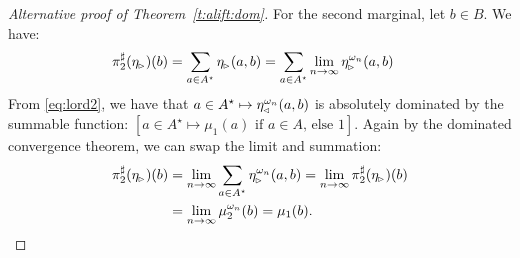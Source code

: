 \documentclass{lmcs}
\begin{document}
\begin{proof}[Alternative proof of Theorem~\ref{t:alift:dom}]
  \medskip

  For the second marginal, let $b \in B$. We have:
  \begin{align*}
    \pi_{2}^{\sharp}(\eta_{\mspace{-1.5mu}{\scriptscriptstyle \vartriangleright}})(b)
      &= \sum_{a \in A^\star} \eta_{\mspace{-1.5mu}{\scriptscriptstyle \vartriangleright}}(a, b)
       = \sum_{a \in A^\star} \lim_{n \to \infty} \eta_{\mspace{-1.5mu}{\scriptscriptstyle \vartriangleright}}^{\omega_n}(a, b)
  \end{align*}
  From \eqref{eq:lord2}, we have that
  $a \in A^\star \mapsto \eta_{\mspace{-1.5mu}{\scriptscriptstyle \vartriangleleft}}^{\omega_n}(a, b)$ is absolutely
  dominated by the summable function:
  $[a \in A^\star \mapsto \text{$\mu_1(a)$ if $a \in A$, else $1$}]$.
  Again by the dominated convergence theorem, we can swap the limit and
  summation:
  \begin{align*}
    \pi_{2}^{\sharp}(\eta_{\mspace{-1.5mu}{\scriptscriptstyle \vartriangleright}})(b)
      &= \lim_{n \to \infty} \sum_{a \in A^\star} \eta_{\mspace{-1.5mu}{\scriptscriptstyle \vartriangleright}}^{\omega_n}(a,b)
       = \lim_{n \to \infty} \pi_{2}^{\sharp}(\eta_{\mspace{-1.5mu}{\scriptscriptstyle \vartriangleright}})(b) \\
     & = \lim_{n \to \infty} \mu_2^{\omega_n}(b) = \mu_1(b) .
  \end{align*}


\end{proof}
\end{document}
